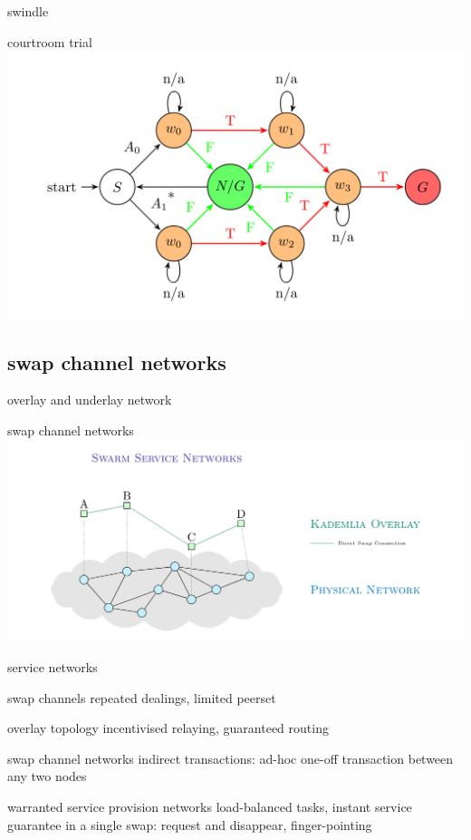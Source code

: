 \documentclass{beamer}
\begin{document}
\begin{frame}{swindle}
\begin{block}{courtroom trial}
\includegraphics[width=\textwidth]{fsa-swindle.png}
\end{block}
\end{frame}


\subsection{swap channel networks}

\begin{frame}{overlay and underlay network}
\begin{block}{swap channel networks}
\includegraphics[width=\textwidth]{overlay-underlay.png}
\end{block}
\end{frame}

\begin{frame}{service networks}
  \begin{block}{swap channels}
    repeated dealings, limited peerset
  \end{block}
  \begin{block}{overlay topology}
    incentivised relaying, guaranteed routing
  \end{block}
  \begin{block}{swap channel networks}
    indirect transactions: ad-hoc one-off transaction between any two nodes
  \end{block}
  \begin{block}{warranted service provision networks}
    load-balanced tasks, instant service guarantee in a single swap: request and disappear, finger-pointing
  \end{block}
\end{frame}
\end{document}

